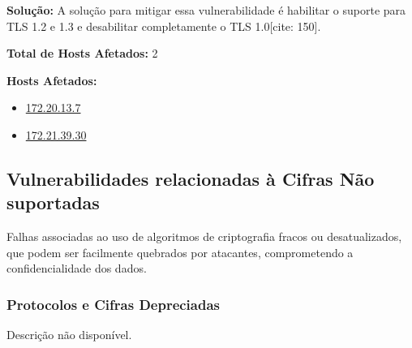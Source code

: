 \documentclass[a4paper,12pt]{article}
\begin{document}
\begin{enumerate}
\textbf{Solução:} A solução para mitigar essa vulnerabilidade é habilitar o suporte para TLS 1.2 e 1.3 e desabilitar completamente o TLS 1.0[cite: 150].

\textbf{Total de Hosts Afetados:} 2

\textbf{Hosts Afetados:}
\begin{itemize}
    \item \url{172.20.13.7}
    \item \url{172.21.39.30}
\end{itemize}

\end{enumerate}
\subsection{Vulnerabilidades relacionadas à Cifras Não suportadas}
Falhas associadas ao uso de algoritmos de criptografia fracos ou desatualizados, que podem ser facilmente quebrados por atacantes, comprometendo a confidencialidade dos dados.

\subsubsection{Protocolos e Cifras Depreciadas}
Descrição não disponível.
\end{document}
